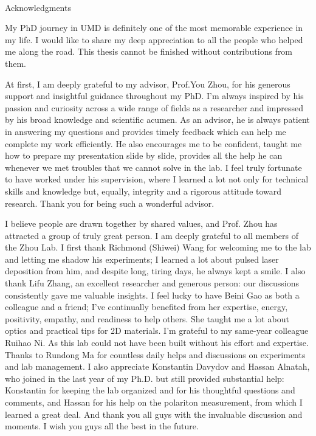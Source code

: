 
\renewcommand{\baselinestretch}{2}
\small\normalsize
\hbox{\ }
 
\vspace{0in}

\begin{center}
\large{Acknowledgments} 
\end{center} 

My PhD journey in UMD is definitely one of the most memorable experience in my life. 
I would like to share my deep appreciation to all the people who helped me along the road. 
This thesis cannot be finished without contributions from them.

At first, I am deeply grateful to my advisor, Prof.You Zhou, 
for his generous support and insightful guidance throughout my PhD.
I’m always inspired by his passion and curiosity across a wide range of fields as a researcher and impressed by his broad knowledge and scientific acumen. 
As an advisor, he is always patient in answering my questions and provides timely feedback which can help me complete my work efficiently.
He also encourages me to be confident, taught me how to prepare my presentation slide by slide, provides all the help he can whenever we met troubles that we cannot solve in the lab. 
I feel truly fortunate to have worked under his supervision, where I learned a lot not only for technical skills and knowledge but, equally, integrity and a rigorous attitude toward research.
Thank you for being such a wonderful advisor.

I believe people are drawn together by shared values, and Prof. Zhou has attracted a group of truly great person. 
I am deeply grateful to all members of the Zhou Lab.
I first thank Richmond (Shiwei) Wang for welcoming me to the lab and letting me shadow his experiments; I learned a lot about pulsed laser deposition from him, and despite long, tiring days, he always kept a smile. 
I also thank Lifu Zhang, an excellent researcher and generous person: our discussions consistently gave me valuable insights. 
I feel lucky to have Beini Gao as both a colleague and a friend; 
I’ve continually benefited from her expertise, energy, positivity, empathy, and readiness to help others.
She taught me a lot about optics and practical tips for 2D materials.
I’m grateful to my same-year colleague Ruihao Ni.
As this lab could not have been built without his effort and expertise. 
Thanks to Rundong Ma for countless daily helps and discussions on experiments and lab management.
I also appreciate Konstantin Davydov and Hassan Alnatah, who joined in the last year of my Ph.D. but still provided substantial help: Konstantin for keeping the lab organized and for his thoughtful questions and comments, 
and Hassan for his help on the polariton measurement, from which I learned a great deal. 
And thank you all guys with the invaluable discussion and moments. 
I wish you guys all the best in the future.

